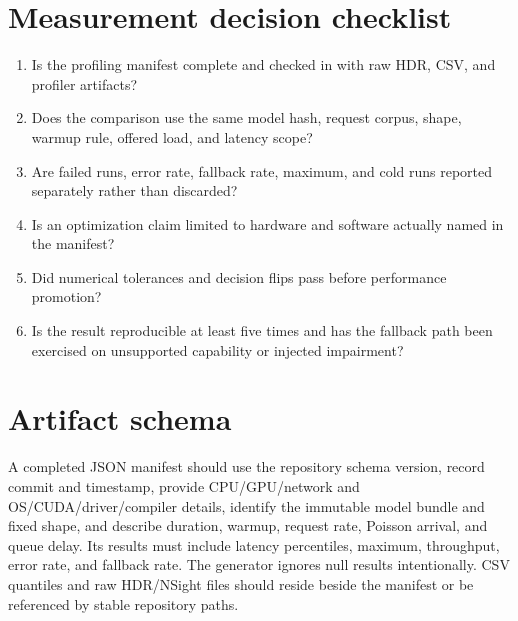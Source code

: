 \documentclass[10pt,a4paper,twocolumn]{article}
\begin{document}
\section{Measurement decision checklist}
\begin{enumerate}
\item Is the profiling manifest complete and checked in with raw HDR, CSV, and
profiler artifacts?
\item Does the comparison use the same model hash, request corpus, shape,
warmup rule, offered load, and latency scope?
\item Are failed runs, error rate, fallback rate, maximum, and cold runs
reported separately rather than discarded?
\item Is an optimization claim limited to hardware and software actually named
in the manifest?
\item Did numerical tolerances and decision flips pass before performance
promotion?
\item Is the result reproducible at least five times and has the fallback path
been exercised on unsupported capability or injected impairment?
\end{enumerate}

\section{Artifact schema}
A completed JSON manifest should use the repository schema version, record
commit and timestamp, provide CPU/GPU/network and OS/CUDA/driver/compiler
details, identify the immutable model bundle and fixed shape, and describe
duration, warmup, request rate, Poisson arrival, and queue delay. Its results
must include latency percentiles, maximum, throughput, error rate, and fallback
rate. The generator ignores null results intentionally. CSV quantiles and raw
HDR/NSight files should reside beside the manifest or be referenced by stable
repository paths.
\end{document}
